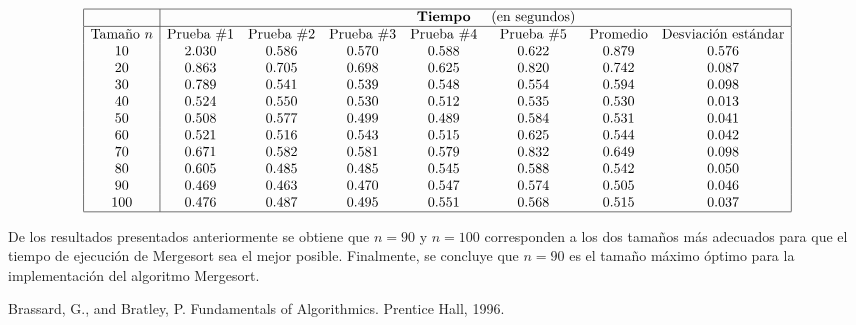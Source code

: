 \documentclass{article}
\begin{document}
	$$\begin{array}{|c|ccccccc|}
		\hline
		& & &&\text{\textbf{Tiempo}} &\text{(en segundos)} & &\\
		\hline
		\text{Tamaño}\ n & \text{Prueba}\ \# 1 & \text{Prueba}\ \# 2 & \text{Prueba}\ \# 3 & \text{Prueba}\ \# 4 & \text{Prueba}\ \# 5 & \text{Promedio} & \text{Desviación estándar}\\
		10 & 2.030 & 0.586 & 0.570 & 0.588 & 0.622 & 0.879 & 0.576\\
		20 & 0.863 & 0.705 & 0.698 & 0.625 & 0.820 & 0.742 & 0.087\\
		30 & 0.789 & 0.541 & 0.539 & 0.548 & 0.554 & 0.594 & 0.098\\
		40 & 0.524 & 0.550 & 0.530 & 0.512 & 0.535 & 0.530 & 0.013\\
		50 & 0.508 & 0.577 & 0.499 & 0.489 & 0.584 & 0.531 & 0.041\\
		60 & 0.521 & 0.516 & 0.543 & 0.515 & 0.625 & 0.544 & 0.042\\
		70 & 0.671 & 0.582 & 0.581 & 0.579 & 0.832 & 0.649 & 0.098\\
		80 & 0.605 & 0.485 & 0.485 & 0.545 & 0.588 & 0.542 & 0.050\\
		90 & 0.469 & 0.463 & 0.470 & 0.547 & 0.574 & 0.505 & 0.046\\
		100 & 0.476 & 0.487 & 0.495 & 0.551 & 0.568 & 0.515 & 0.037\\
		\hline
	\end{array}$$\:
	
	De los resultados presentados anteriormente se obtiene que $n = 90$ y $n = 100$ corresponden a los dos tamaños m\'as adecuados para que el tiempo de ejecuci\'on de Mergesort sea el mejor posible. Finalmente, se concluye que $n = 90$ es el tamaño m\'aximo \'optimo para la implementaci\'on del algoritmo Mergesort.
	
	\begin{thebibliography}{}
		 Brassard, G., and Bratley, P. Fundamentals of Algorithmics. Prentice Hall, 1996.
	\end{thebibliography}
	
\end{document}
